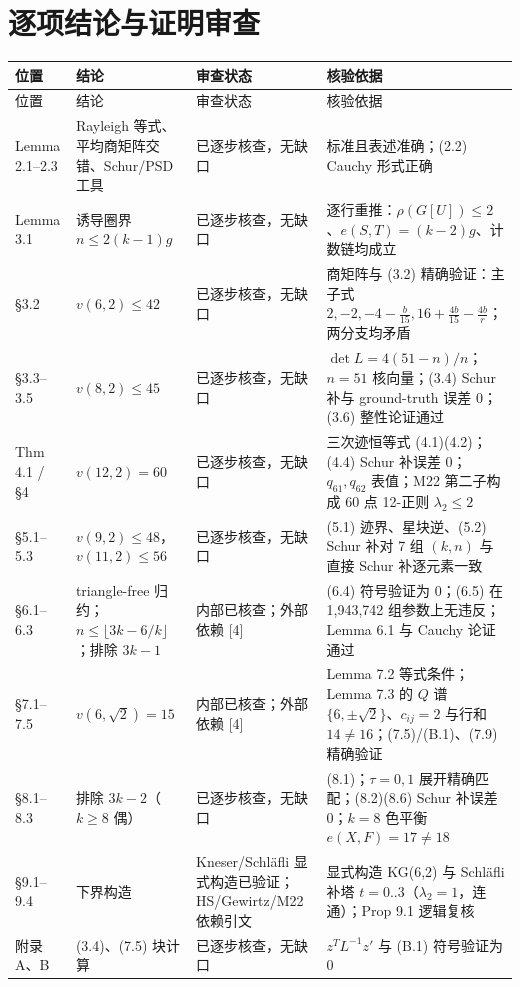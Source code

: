 \documentclass[UTF8,11pt]{ctexart}
\begin{document}
\section{逐项结论与证明审查}
{\small
\begin{longtable}{@{}p{2.2cm}p{3.4cm}p{2.6cm}p{6.6cm}@{}}
\toprule
位置 & 结论 & 审查状态 & 核验依据\\
\midrule
\endfirsthead
\toprule
位置 & 结论 & 审查状态 & 核验依据\\
\midrule
\endhead
Lemma 2.1--2.3 & Rayleigh 等式、平均商矩阵交错、Schur/PSD 工具 & 已逐步核查，无缺口 & 标准且表述准确；(2.2) Cauchy 形式正确\\
Lemma 3.1 & 诱导圈界 $n\le2(k-1)g$ & 已逐步核查，无缺口 & 逐行重推：$\rho(G[U])\le2$、$e(S,T)=(k-2)g$、计数链均成立\\
\S3.2 & $v(6,2)\le42$ & 已逐步核查，无缺口 & 商矩阵与 (3.2) 精确验证：主子式 $2,-2,-4-\tfrac b{15},16+\tfrac{4b}{15}-\tfrac{4b}r$；两分支均矛盾\\
\S3.3--3.5 & $v(8,2)\le45$ & 已逐步核查，无缺口 & $\det L=4(51-n)/n$；$n=51$ 核向量；(3.4) Schur 补与 ground-truth 误差 0；(3.6) 整性论证通过\\
Thm 4.1 / \S4 & $v(12,2)=60$ & 已逐步核查，无缺口 & 三次迹恒等式 (4.1)(4.2)；(4.4) Schur 补误差 0；$q_{61},q_{62}$ 表值；M22 第二子构成 60 点 12-正则 $\lambda_2\le2$\\
\S5.1--5.3 & $v(9,2)\le48$，$v(11,2)\le56$ & 已逐步核查，无缺口 & (5.1) 迹界、星块逆、(5.2) Schur 补对 7 组 $(k,n)$ 与直接 Schur 补逐元素一致\\
\S6.1--6.3 & triangle-free 归约；$n\le\lfloor3k-6/k\rfloor$；排除 $3k-1$ & 内部已核查；外部依赖 [4] & (6.4) 符号验证为 0；(6.5) 在 1{,}943{,}742 组参数上无违反；Lemma 6.1 与 Cauchy 论证通过\\
\S7.1--7.5 & $v(6,\sqrt2)=15$ & 内部已核查；外部依赖 [4] & Lemma 7.2 等式条件；Lemma 7.3 的 $Q$ 谱 $\{6,\pm\sqrt2\}$、$c_{ij}=2$ 与行和 $14\ne16$；(7.5)/(B.1)、(7.9) 精确验证\\
\S8.1--8.3 & 排除 $3k-2$（$k\ge8$ 偶） & 已逐步核查，无缺口 & (8.1)；$\tau=0,1$ 展开精确匹配；(8.2)(8.6) Schur 补误差 0；$k=8$ 色平衡 $e(X,F)=17\ne18$\\
\S9.1--9.4 & 下界构造 & Kneser/Schl\"afli 显式构造已验证；HS/Gewirtz/M22 依赖引文 & 显式构造 KG(6,2) 与 Schl\"afli 补塔 $t=0..3$（$\lambda_2=1$，连通）；Prop 9.1 逻辑复核\\
附录 A、B & (3.4)、(7.5) 块计算 & 已逐步核查，无缺口 & $z^TL^{-1}z'$ 与 (B.1) 符号验证为 0\\
\bottomrule
\end{longtable}}
\end{document}
